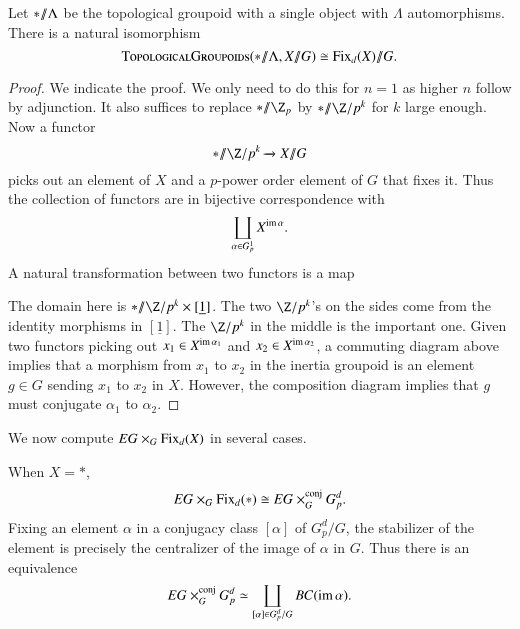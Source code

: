 \begin{lemma} \label{inertialemma}
Let $\ast /\!\!/ \Lambda$ be the topological groupoid with a single object with $\Lambda$ automorphisms. There is a natural isomorphism 
\[
\normalfont\textsc{TopologicalGroupoids}(\ast /\!\!/ \Lambda, X /\!\!/ G) \cong \operatorname{Fix}_d(X) /\!\!/ G.
\]
\end{lemma} 
\begin{proof}
We indicate the proof. We only need to do this for $n=1$ as higher $n$ follow by adjunction. It also suffices to replace $\ast \mmod \Z_p$ by $\ast \mmod \Z/p^k$ for $k$ large enough. Now a functor
\[
\ast \mmod \Z/p^k \xrightarrow{} X \mmod G
\]
picks out an element of $X$ and a $p$-power order element of $G$ that fixes it. Thus the collection of functors are in bijective correspondence with
\[
\coprod_{\alpha \in G^{1}_{p}} X^{\operatorname{im} \alpha}.
\]
A natural transformation between two functors is a map
\begin{center}
\end{center}
The domain here is $\ast \mmod \Z/p^k \times [\underline{1}]$. The two $\Z/p^k$'s on the sides come from the identity morphisms in $[\underline{1}]$. The $\Z/p^k$ in the middle is the important one. Given two functors picking out $x_1 \in X^{\operatorname{im} \alpha_1}$ and $x_2 \in X^{\operatorname{im} \alpha_2}$, a commuting diagram above implies that a morphism from $x_1$ to $x_2$ in the inertia groupoid is an element $g \in G$ sending $x_1$ to $x_2$ in $X$. However, the composition diagram implies that $g$ must conjugate $\alpha_1$ to $\alpha_2$.
\end{proof}

We now compute $EG \times_G \operatorname{Fix}_d(X)$ in several cases.

\begin{example} \label{xapoint2}
When $X = \ast$,
\[
EG \times_G \operatorname{Fix}_d(\ast) \cong EG \times_{G}^{\text{conj}} G_{p}^{d}.
\]
Fixing an element $\alpha$ in a conjugacy class $[\alpha]$ of $G_{p}^{d}/G$, the stabilizer of the element is precisely the centralizer of the image of $\alpha$ in $G$. Thus there is an equivalence
\[
EG \times_{G}^{\text{conj}} G_{p}^{d} \simeq \coprod_{[\alpha] \in G_{p}^{d}/G} BC(\operatorname{im} \alpha).
\]
\end{example}

